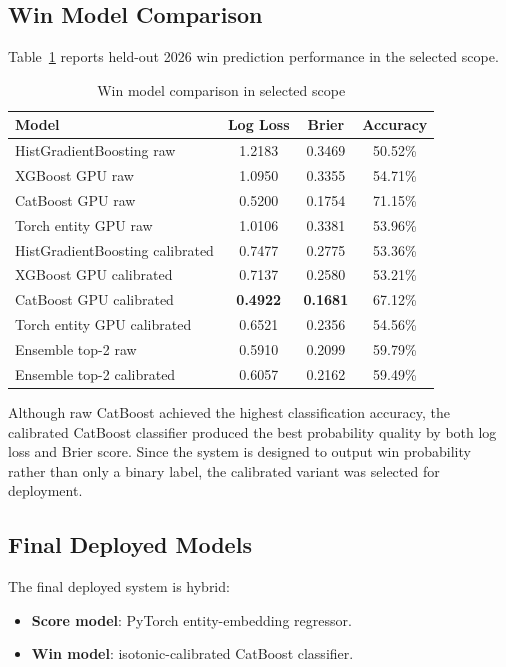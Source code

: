 \documentclass[conference]{IEEEtran}
\begin{document}
\subsection{Win Model Comparison}
Table~\ref{tab:win} reports held-out 2026 win prediction performance in the selected scope.

\begin{table}[!t]
\caption{Win model comparison in selected scope}
\label{tab:win}
\centering
\begin{tabular}{lccc}
\toprule
Model & Log Loss & Brier & Accuracy \\
\midrule
HistGradientBoosting raw & 1.2183 & 0.3469 & 50.52\% \\
XGBoost GPU raw & 1.0950 & 0.3355 & 54.71\% \\
CatBoost GPU raw & 0.5200 & 0.1754 & 71.15\% \\
Torch entity GPU raw & 1.0106 & 0.3381 & 53.96\% \\
HistGradientBoosting calibrated & 0.7477 & 0.2775 & 53.36\% \\
XGBoost GPU calibrated & 0.7137 & 0.2580 & 53.21\% \\
CatBoost GPU calibrated & \textbf{0.4922} & \textbf{0.1681} & 67.12\% \\
Torch entity GPU calibrated & 0.6521 & 0.2356 & 54.56\% \\
Ensemble top-2 raw & 0.5910 & 0.2099 & 59.79\% \\
Ensemble top-2 calibrated & 0.6057 & 0.2162 & 59.49\% \\
\bottomrule
\end{tabular}
\end{table}

Although raw CatBoost achieved the highest classification accuracy, the calibrated CatBoost classifier produced the best probability quality by both log loss and Brier score. Since the system is designed to output win probability rather than only a binary label, the calibrated variant was selected for deployment.

\subsection{Final Deployed Models}
The final deployed system is hybrid:
\begin{itemize}
\item \textbf{Score model}: PyTorch entity-embedding regressor.
\item \textbf{Win model}: isotonic-calibrated CatBoost classifier.
\end{itemize}
\end{document}
